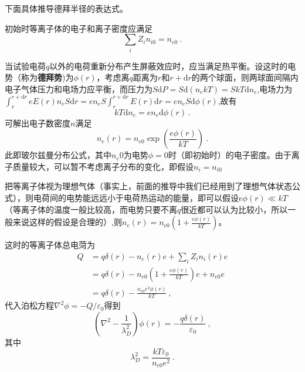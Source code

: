 			下面具体推导德拜半径的表达式。
			
			初始时等离子体的电子和离子密度应满足
			\begin{equation} 
			\sum_i Z_i n_{i0}=n_{e0}~.
			\end{equation}
			
			当试验电荷$q$以外的电荷重新分布产生屏蔽效应时，应当满足热平衡。设这时的电势（称为\textbf{德拜势})为$\phi(r)$，考虑离$q$距离为$r$和$r+\mathrm{d} r$的两个球面，则两球面间隔内电子气体压力和电场力应平衡，而压力为$S\mathrm{d}P=S\mathrm{d}(n_ekT)=SkT\mathrm{d}n_e$,电场力为$\int_r^{r+\mathrm{d}r} eE(r)n_eS\mathrm{d}r=en_eS\int_r^{r+\mathrm{d}r}E(r)\mathrm{d}r=en_eS\mathrm{d}\phi(r)$,故有
			\begin{equation} 
			kT\mathrm{d}n_e=en_e\mathrm{d}\phi(r)~.
			\end{equation}
			可解出电子数密度$n$满足
			\begin{equation} 
			n_e(r)=n_{e0}\exp{\left( \frac{e\phi(r)}{kT}\right)}~.
			\end{equation}
			此即玻尔兹曼分布公式，其中$n_e0$为电势$\phi=0$时（即初始时）的电子密度。由于离子质量较大，可以暂不考虑离子分布的变化，即假设$n_i=n_{i0}$
			
			把等离子体视为理想气体（事实上，前面的推导中我们已经用到了理想气体状态公式），则电荷间的电势能远远小于电荷热运动的能量，即可以假设$e\phi(r)\ll kT$（等离子体的温度一般比较高，而电势只要不离$q$很近都可以认为比较小，所以一般来说这样的假设是合理的）,则$n_e(r)=n_{e0}(1+\frac{e\phi(r)}{kT})$。
			
			这时的等离子体总电菏为
			\begin{equation}
			\begin{aligned} 
			Q&=q\delta(r)-n_e(r)e+\sum_{i} Z_i n_{i}(r)e\\
			&=q\delta(r)-n_{e0}(1+\frac{e\phi(r)}{kT})e+n_{e0}e\\
			&=q\delta(r)-\frac{n_{e0}e^2\phi(r)}{kT}~,
			\end{aligned}
			\end{equation}
			代入泊松方程$\nabla^2\phi=-Q/\varepsilon_0$得到
			\begin{equation} 
			(\nabla^2-\frac{1}{\lambda_D^2})\phi(r)=-\frac{q\delta(r)}{\varepsilon_0}~,
			\end{equation}
			其中
			\begin{equation}
				\boxed{\lambda_D^2=\frac{kT\varepsilon_0}{n_{e0}e^2}}~.
			\end{equation}
			
